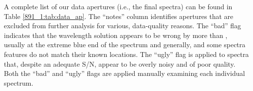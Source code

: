 A complete list of our data apertures (i.e., the final spectra) can be
found in Table \ref{891_1:tab:data_ap}. The ``notes'' column identifies
apertures that are excluded from further analysis for various,
data-quality reasons. The ``bad'' flag indicates that the wavelength
solution appears to be wrong by more than ,
usually at the extreme blue end of the spectrum and generally, and
some spectra features do not match their known locations. The ``ugly''
flag is applied to spectra that, despite an adequate S/N, appear to be
overly noisy and of poor quality. Both the ``bad'' and ``ugly'' flags
are applied manually examining each individual spectrum.

